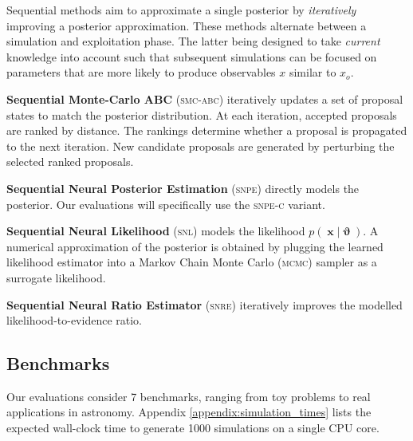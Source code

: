 \documentclass[twoside]{article}
\DeclareMathOperator{\vtheta}{\boldsymbol\vartheta}
\DeclareMathOperator{\vx}{\boldsymbol x}
\newcommand{\snre}{\textsc{snre}}
\newcommand{\snpe}{\textsc{snpe}}
\begin{document}

Sequential methods aim to approximate a single posterior by \emph{iteratively} improving a posterior approximation. These methods alternate between a simulation and exploitation phase. The latter being designed to take \emph{current} knowledge into account such that subsequent simulations can be focused on parameters that are more likely to produce observables $x$ similar to $x_o$.

{\bfseries Sequential Monte-Carlo ABC} (\textsc{smc-abc}) \citep{10.1093/bioinformatics/btp619, sisson2007sequential, beaumont2009adaptive}
iteratively updates a set of proposal states to match the posterior distribution. At each iteration, accepted proposals are ranked by distance. The rankings determine whether a proposal is propagated to the next iteration. New candidate proposals are generated by perturbing the selected ranked proposals.

{\bfseries Sequential Neural Posterior Estimation} (\snpe) \citep{papamakarios2016fast, lueckmann2017flexible, greenberg2019automatic} directly models the posterior.
Our evaluations will specifically use the \textsc{snpe-c} \citep{greenberg2019automatic} variant.

{\bfseries Sequential Neural Likelihood} (\textsc{snl}) \citep{papamakarios2019sequential} models the likelihood $p(\vx|\vtheta)$. A numerical approximation of the posterior is obtained by plugging the learned likelihood estimator into a Markov Chain Monte Carlo (\textsc{mcmc}) sampler as a surrogate likelihood.

{\bfseries Sequential Neural Ratio Estimator} (\snre) \citep{2019arXiv190304057H,durkan2020contrastive} iteratively improves the modelled likelihood-to-evidence ratio.
\subsection{Benchmarks}
Our evaluations consider 7 benchmarks, ranging from toy problems to real applications in astronomy. Appendix \ref{appendix:simulation_times} lists the expected wall-clock time to generate 1000 simulations on a single CPU core.
\end{document}
